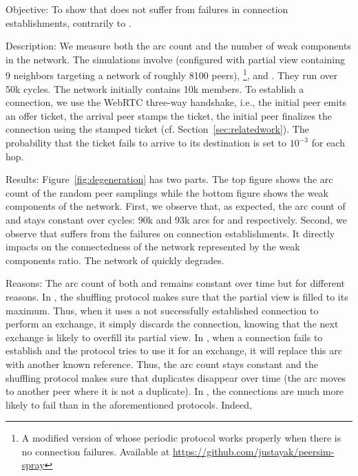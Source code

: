 \begin{asparadesc}
\item[Objective:] To show that \SPRAY does not suffer from failures in
  connection establishments, contrarily to \SCAMP.
\item[Description:] We measure both the arc count and the number of weak
  components in the network. The simulations involve \CYCLON (configured with
  partial view containing 9 neighbors targeting a network of roughly 8100
  peers), \SCAMP\footnote{A modified version of \SCAMP whose periodic protocol
    works properly when there is no connection failures. Available at
    \url{https://github.com/justayak/peersim-spray}}, and \SPRAY. They run over
  50k cycles. The network initially contains 10k members.  To establish a
  connection, we use the WebRTC three-way handshake, i.e., the initial peer
  emits an offer ticket, the arrival peer stamps the ticket, the initial peer
  finalizes the connection using the stamped ticket
  (cf. Section~\ref{sec:relatedwork}). The probability that the ticket fails to
  arrive to its destination is set to $10^{-3}$ for each hop.
\item[Results:] Figure~\ref{fig:degeneration} has two parts. The
  top figure shows the arc count of the random peer samplings while the bottom
  figure shows the weak components of the network.  First, we observe that, as
  expected, the arc count of \CYCLON and \SPRAY stays constant over cycles: 90k
  and 93k arcs for \CYCLON and \SPRAY respectively. Second, we observe that
  \SCAMP suffers from the failures on connection establishments. It directly
  impacts on the connectedness of the network represented by the weak
  components ratio. The network of \SCAMP quickly degrades.
\item[Reasons:] The arc count of both \CYCLON and \SPRAY remains constant over
  time but for different reasons. In \CYCLON, the shuffling protocol makes sure
  that the partial view is filled to its maximum. Thus, when it uses a not
  successfully established connection to perform an exchange, it simply
  discards the connection, knowing that the next exchange is likely to overfill
  its partial view. In \SPRAY, when a connection fails to establish and the
  protocol tries to use it for an exchange, it will replace this arc with
  another known reference. Thus, the arc count stays constant and the shuffling
  protocol makes sure that duplicates disappear over time (the arc moves to
  another peer where it is not a duplicate). In \SCAMP, the connections are
  much more likely to fail than in the aforementioned protocols. Indeed,

\end{asparadesc}

